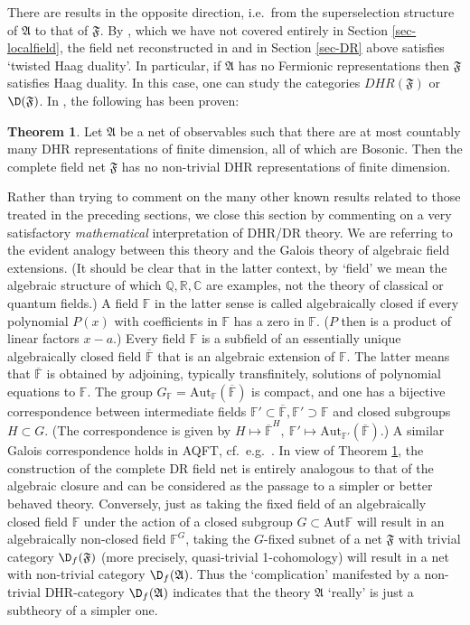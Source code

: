 \documentclass[11pt]{article}
\newcommand{\alg}[1]{\mathfrak{#1}}
\theoremstyle{definition}
\newtheorem{thm}{Theorem}[section]
\theoremstyle{definition}
\theoremstyle{remark}
\def\7#1{{\mathbb #1}}
\newcommand{\Aut}{\mathrm{Aut}}
\begin{document}
There are results in the opposite direction, i.e.\ from
the superselection structure of $\alg{A}$ to that of
$\alg{F}$. By \cite[Theorem 3.6]{dr2}, which we have
not covered entirely in Section \ref{sec-localfield},
the field net reconstructed in \cite{dr2} and in
Section \ref{sec-DR} above satisfies `twisted Haag
duality'. In particular, if $\alg{A}$ has no Fermionic
representations then $\alg{F}$ satisfies Haag
duality. In this case, one can study the categories
$DHR(\alg{F})$ or $\D(\alg{F})$. In \cite{CDR}, the
following has been proven:

\begin{thm} \label{thm-cdr} Let $\alg{A}$ be a net of
  observables such that there are at most countably
  many DHR representations of finite dimension, all of
  which are Bosonic. Then the complete field net
  $\alg{F}$ has no non-trivial DHR representations of
  finite dimension.
\end{thm}

Rather than trying to comment on the many other known
results related to those treated in the preceding
sections, we close this section by commenting on a very
satisfactory {\it mathematical} interpretation of
DHR/DR theory. We are referring to the evident analogy
between this theory and the Galois theory of algebraic
field extensions. (It should be clear that in the
latter context, by `field' we mean the algebraic
structure of which $\7Q,\7R,\7C$ are examples, not the
theory of classical or quantum fields.) A field $\7F$
in the latter sense is called algebraically closed if
every polynomial $P(x)$ with coefficients in $\7F$ has
a zero in $\7F$. ($P$ then is a product of linear
factors $x-a$.) Every field $\7F$ is a subfield of an
essentially unique algebraically closed field
$\overline{\7F}$ that is an algebraic extension of
$\7F$. The latter means that $\overline{\7F }$ is
obtained by adjoining, typically transfinitely,
solutions of polynomial equations to $\7F$. The group
$G_\7F=\Aut_\7F(\overline{\7F})$ is compact, and one
has a bijective correspondence between intermediate
fields $\7F'\subset\overline{\7F},\7F'\supset\7F$ and
closed subgroups $H\subset G$. (The correspondence is
given by $H\mapsto \overline{\7F}^H,\
\7F'\mapsto\Aut_{\7F'}(\overline{\7F})$.) A similar
Galois correspondence holds in AQFT, cf.\ e.g.\
\cite{CDR,carpi-conti}. In view of Theorem
\ref{thm-cdr}, the construction of the complete DR
field net is entirely analogous to that of the
algebraic closure and can be considered as the passage
to a simpler or better behaved theory. Conversely, just
as taking the fixed field of an algebraically closed
field $\7F$ under the action of a closed subgroup
$G\subset\Aut\7F$ will result in an algebraically
non-closed field $\7F^G$, taking the $G$-fixed subnet
of a net $\alg{F}$ with trivial category
$\D_f(\alg{F})$ (more precisely, quasi-trivial
1-cohomology) will result in a net with non-trivial
category $\D_f(\alg{A})$.  Thus the `complication'
manifested by a non-trivial DHR-category
$\D_f(\alg{A})$ indicates that the theory $\alg{A}$
`really' is just a subtheory of a simpler one.
\end{document}
